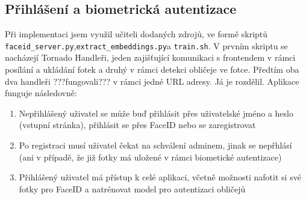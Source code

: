 \subsection{Přihlášení a biometrická autentizace}
Při implementaci jsem využil učiteli dodaných zdrojů, ve formě skriptů \verb|faceid_server.py|,\newline \verb|extract_embeddings.py|a \verb|train.sh|.
V prvním skriptu se nacházejí Tornado Handleři, jeden zajišťující komunikaci s frontendem v rámci posílání a ukládání fotek a druhý v rámci detekci obličeje ve fotce.
Předtím oba dva handleři ???fungovali??? v rámci jedné URL adresy. Já je rozdělil. Aplikace funguje následovně:
\begin{enumerate}
    \item Nepřihlášený uživatel se může buď přihlásit přes uživatelské jméno a heslo (vstupní stránka), přihlásit se přes FaceID nebo se zaregistrovat
    \item Po registraci musí uživatel čekat na schválení adminem, jinak se nepřhlásí (ani v případě, že již fotky má uložené v rámci biometické autentizace)
    \item Přihlášený uživatel má přístup k celé aplikaci, včetně možnosti nafotit si své fotky pro FaceID a natrénovat model pro autentizaci obličejů
\end{enumerate} 

